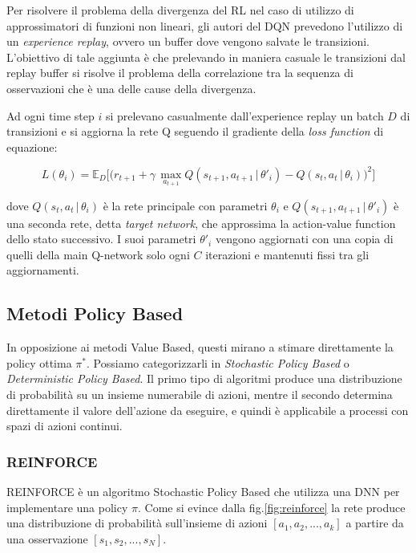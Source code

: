Per risolvere il problema della divergenza del RL nel caso di utilizzo di approssimatori di funzioni non lineari\cite{rlinstabilityPaper}, gli autori del DQN prevedono l'utilizzo di un \textit{experience replay}, ovvero un buffer dove vengono salvate le transizioni. L'obiettivo di tale aggiunta è che prelevando in maniera casuale le transizioni dal replay buffer si risolve il problema della correlazione tra la sequenza di osservazioni che è una delle cause della divergenza. 
\newline

Ad ogni time step $i$ si prelevano casualmente dall'experience replay un batch $D$ di transizioni e si aggiorna la rete Q seguendo il gradiente della \textit{loss function} di equazione:

\begin{equation}
L(\theta_i) = \mathbb{E}_D 
	\Bigg[ 
	\Big(
	r_{t+1} + \gamma\,\max_{a_{t+1}}Q(s_{t+1},a_{t+1} \,| \,\theta'_i) - Q(s_t,a_t \,| \, \theta_i)
	\Big)^2
	\Bigg]
\end{equation}
	

dove $Q(s_t,a_t \,| \, \theta_i)$ è la rete principale con parametri $\theta_i$ e $Q(s_{t+1},a_{t+1} \,| \,\theta'_i)$ è una seconda rete, detta \textit{target network}, che approssima la action-value function dello stato successivo. I suoi parametri $\theta'_i$ vengono aggiornati con una copia di quelli della main Q-network solo ogni $C$ iterazioni e mantenuti fissi tra gli aggiornamenti.

\clearpage

\subsection{Metodi Policy Based}

In opposizione ai metodi Value Based, questi mirano a stimare direttamente la policy ottima $\pi^*$. Possiamo categorizzarli in \textit{Stochastic Policy Based} o \textit{Deterministic Policy Based}. Il primo tipo di algoritmi produce una distribuzione di probabilità su un insieme numerabile di azioni, mentre il secondo determina direttamente il valore dell'azione da eseguire, e quindi è applicabile a processi con spazi di azioni continui.

\subsubsection{REINFORCE}

REINFORCE\cite{reinforcePaper} è un algoritmo Stochastic Policy Based che utilizza una DNN per implementare una policy $\pi$. Come si evince dalla fig.\ref{fig:reinforce} la rete produce una distribuzione di probabilità sull'insieme di azioni $[a_1,a_2,...,a_k]$ a partire da una osservazione $[s_1,s_2,...,s_N]$.
\newline

